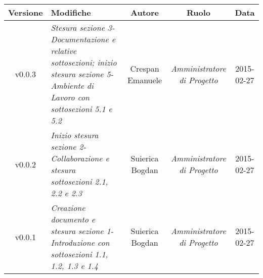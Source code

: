 \newpage
\begin{table}[h]
\centering
\begin{tabular}{|c|p{}|c|c|c|}
	\toprule
		\textbf{Versione} & \textbf{Modifiche} & \textbf{Autore} & \textbf{Ruolo} & \textbf{Data} \\
	\midrule
	\midrule
		v0.0.3 & \textit{Stesura sezione 3-Documentazione e relative sottosezioni; inizio stesura sezione 5-Ambiente di Lavoro con sottosezioni 5.1 e 5.2} & Crespan Emanuele & \textit{Amministratore di Progetto} & 2015-02-27\\
	\midrule
		v0.0.2 & \textit{Inizio stesura sezione 2-Collaborazione e stesura sottosezioni 2.1, 2.2 e 2.3} & Suierica Bogdan & \textit{Amministratore di Progetto} & 2015-02-27\\
	\midrule
		v0.0.1 & \textit{Creazione documento e stesura sezione 1-Introduzione con sottosezioni 1.1, 1.2, 1.3 e 1.4} & Suierica Bogdan & \textit{Amministratore di Progetto} & 2015-02-27\\
	\bottomrule
\end{tabular}
\end{table}
\newpage
